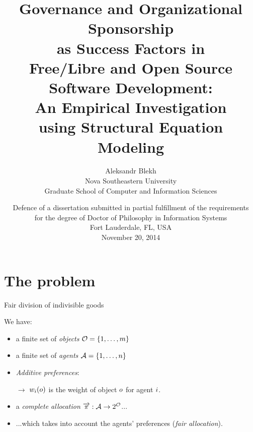 \documentclass[9pt,english]{beamer}
\author{\parbox{0.7\textwidth}{Aleksandr Blekh\\[0.1cm]
    {Nova Southeastern University}\\
     Graduate School of Computer and Information Sciences}}
\date{Defence of a dissertation submitted in partial fulfillment of the requirements\\
      for the degree of Doctor of Philosophy in Information Systems\\
      Fort Lauderdale, FL, USA\\
      November 20, 2014}
\title{Governance and Organizational Sponsorship\\
       as Success Factors in\\
       Free/Libre and Open Source Software Development:\\
       An Empirical Investigation\\
       using Structural Equation Modeling}
\begin{document}
\begin{frame}[plain]
  \titlepage
\end{frame}

\section{The problem}

\begin{frame}{Fair division of indivisible goods}
  \begin{overlayarea}{\textwidth}{0.5\textheight}
    We have:
    \begin{itemize}
    \item<2-> a finite set of \emph{objects} ${\mathcal{O}} = \{1,\dots,{m}\}$
    \item<3-> a finite set of \emph{agents} ${\mathcal{A}} =
      \{1,\dots,{n}\}$
    \item<4-> \emph{Additive preferences}: \parbox[t]{0.5\textwidth}{$\to$ $w_{i}(o)$ is the
      weight of object $o$ for agent $i$.}
    \end{itemize}
    
    \begin{itemize}
    \item<7-> a \emph{complete allocation} $\overrightarrow{\pi}: {\mathcal{A}} \to
      2^{{\mathcal{O}}}$...
    \item<8-> ...which takes into account the agents' preferences
      (\emph{fair allocation}).
    \end{itemize}

  \end{overlayarea}
  
  \vfill


\end{frame}
\end{document}
